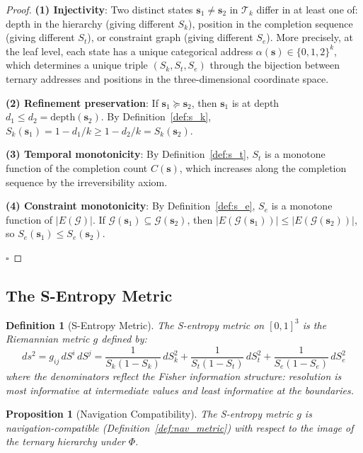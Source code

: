 \documentclass[12pt,twocolumn]{article}
\newtheorem{proposition}[theorem]{Proposition}
\newtheorem{definition}{Definition}[section]
\begin{document}
\begin{proof}
\textbf{(1) Injectivity}: Two distinct states $\mathbf{s}_1 \neq \mathbf{s}_2$ in $\mathcal{T}_k$ differ in at least one of: depth in the hierarchy (giving different $S_k$), position in the completion sequence (giving different $S_t$), or constraint graph (giving different $S_e$). More precisely, at the leaf level, each state has a unique categorical address $\alpha(\mathbf{s}) \in \{0,1,2\}^k$, which determines a unique triple $(S_k, S_t, S_e)$ through the bijection between ternary addresses and positions in the three-dimensional coordinate space.

\textbf{(2) Refinement preservation}: If $\mathbf{s}_1 \succeq \mathbf{s}_2$, then $\mathbf{s}_1$ is at depth $d_1 \leq d_2 = \text{depth}(\mathbf{s}_2)$. By Definition~\ref{def:s_k}, $S_k(\mathbf{s}_1) = 1 - d_1/k \geq 1 - d_2/k = S_k(\mathbf{s}_2)$.

\textbf{(3) Temporal monotonicity}: By Definition~\ref{def:s_t}, $S_t$ is a monotone function of the completion count $C(\mathbf{s})$, which increases along the completion sequence by the irreversibility axiom.

\textbf{(4) Constraint monotonicity}: By Definition~\ref{def:s_e}, $S_e$ is a monotone function of $|E(\mathcal{G})|$. If $\mathcal{G}(\mathbf{s}_1) \subseteq \mathcal{G}(\mathbf{s}_2)$, then $|E(\mathcal{G}(\mathbf{s}_1))| \leq |E(\mathcal{G}(\mathbf{s}_2))|$, so $S_e(\mathbf{s}_1) \leq S_e(\mathbf{s}_2)$.

$\square$
\end{proof}

\subsection{The S-Entropy Metric}

\begin{definition}[S-Entropy Metric]
\label{def:s_metric}
The \emph{S-entropy metric} on $[0,1]^3$ is the Riemannian metric $g$ defined by:
\begin{equation}
\label{eq:s_metric}
ds^2 = g_{ij} \, dS^i \, dS^j = \frac{1}{S_k(1-S_k)} \, dS_k^2 + \frac{1}{S_t(1-S_t)} \, dS_t^2 + \frac{1}{S_e(1-S_e)} \, dS_e^2
\end{equation}
where the denominators reflect the Fisher information structure: resolution is most informative at intermediate values and least informative at the boundaries.
\end{definition}

\begin{proposition}[Navigation Compatibility]
\label{prop:nav_compat}
The S-entropy metric $g$ is navigation-compatible (Definition~\ref{def:nav_metric}) with respect to the image of the ternary hierarchy under $\Phi$.
\end{proposition}
\end{document}
